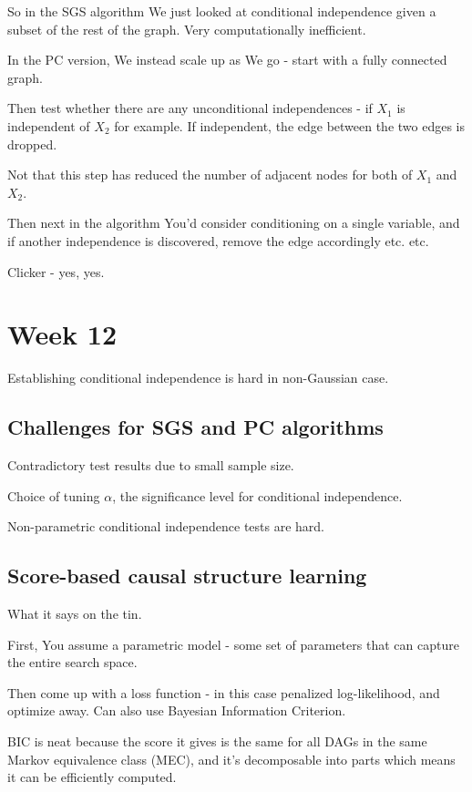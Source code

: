 \documentclass{article}
\begin{document}
		So in the SGS algorithm We just looked at conditional independence given a subset of the rest of the graph. Very computationally inefficient.
		
		In the PC version, We instead scale up as We go - start with a fully connected graph. 
		
		Then test whether there are any unconditional independences - if $X_1$ is independent of $X_2$ for example. If independent, the edge between the two edges is dropped.
		
		Not that this step has reduced the number of adjacent nodes for both of $X_1$ and $X_2$.
		
		Then next in the algorithm You'd consider conditioning on a single variable, and if another independence is discovered, remove the edge accordingly etc. etc.
		
		Clicker - yes, yes.
		
\section{Week 12}

	Establishing conditional independence is hard in non-Gaussian case.
	
	\subsection{Challenges for SGS and PC algorithms}
	
		Contradictory test results due to small sample size.
		
		Choice of tuning $\alpha$, the significance level for conditional independence.
		
		Non-parametric conditional independence tests are hard.
		
	\subsection{Score-based causal structure learning}
	
		What it says on the tin.
		
		First, You assume a parametric model - some set of parameters that can capture the entire search space.
		
		Then come up with a loss function - in this case penalized log-likelihood, and optimize away. Can also use Bayesian Information Criterion.
		
		BIC is neat because the score it gives is the same for all DAGs in the same Markov equivalence class (MEC), and it's decomposable into parts which means it can be efficiently computed.
		
\end{document}
